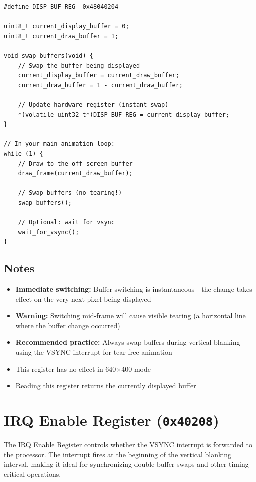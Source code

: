 \documentclass[11pt,letterpaper]{report}
\begin{document}
\begin{lstlisting}[style=c,caption={Double-Buffering Example}]
#define DISP_BUF_REG  0x48040204

uint8_t current_display_buffer = 0;
uint8_t current_draw_buffer = 1;

void swap_buffers(void) {
    // Swap the buffer being displayed
    current_display_buffer = current_draw_buffer;
    current_draw_buffer = 1 - current_draw_buffer;
    
    // Update hardware register (instant swap)
    *(volatile uint32_t*)DISP_BUF_REG = current_display_buffer;
}

// In your main animation loop:
while (1) {
    // Draw to the off-screen buffer
    draw_frame(current_draw_buffer);
    
    // Swap buffers (no tearing!)
    swap_buffers();
    
    // Optional: wait for vsync
    wait_for_vsync();
}
\end{lstlisting}

\subsection{Notes}

\begin{itemize}
    \item \textbf{Immediate switching:} Buffer switching is instantaneous - the change takes effect on the very next pixel being displayed
    \item \textbf{Warning:} Switching mid-frame will cause visible tearing (a horizontal line where the buffer change occurred)
    \item \textbf{Recommended practice:} Always swap buffers during vertical blanking using the VSYNC interrupt for tear-free animation
    \item This register has no effect in 640$\times$400 mode
    \item Reading this register returns the currently displayed buffer
\end{itemize}

\section{IRQ Enable Register (\texttt{0x40208})}

The IRQ Enable Register controls whether the VSYNC interrupt is forwarded to the processor. The interrupt fires at the beginning of the vertical blanking interval, making it ideal for synchronizing double-buffer swaps and other timing-critical operations.
\end{document}

